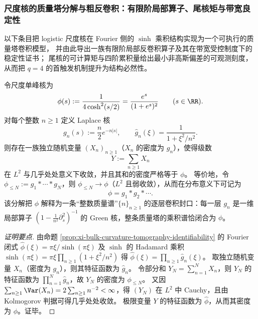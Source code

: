 
\subsubsection{尺度核的质量塔分解与粗反卷积：有限阶局部算子、尾核矩与带宽良定性}\label{subsubsec:xi-scale-kernel-mass-tower-deconvolution}
以下条目把 logistic 尺度核在 Fourier 侧的 \(\sinh\) 乘积结构实现为一个可执行的质量塔卷积模型，
并由此导出一族有限阶局部反卷积算子及其在带宽受控制度下的稳定性证书；
尾核的可计算矩与四阶累积量给出最小非高斯偏差的可观测刻度，从而把 \(q=4\) 的首触发机制提升为结构必然性。

\begin{conclusion}\label{con:xi-terminal-scale-kernel-mass-tower-laplace}
令尺度单峰核为
\[
\phi(s):=\frac{1}{4\cosh^{2}(s/2)}=\frac{e^{s}}{(1+e^{s})^{2}}\qquad(s\in\RR).
\]
对每个整数 \(n\ge 1\) 定义 Laplace 核
\[
g_n(s):=\frac{n}{2}e^{-n|s|},
\qquad
\widehat g_n(\xi)=\frac{1}{1+\xi^{2}/n^{2}}.
\]
则存在一族独立随机变量 \((X_n)_{n\ge 1}\)（\(X_n\) 的密度为 \(g_n\)），使得级数
\[
Y:=\sum_{n\ge 1}X_n
\]
在 \(L^{2}\) 与几乎处处意义下收敛，并且其和的密度严格等于 \(\phi\)。
等价地，令 \(\phi_{\le N}:=g_1*\cdots*g_N\)，则 \(\phi_{\le N}\to\phi\)（\(L^2\) 且弱收敛），从而在分布意义下可记为
\[
\phi=g_1*g_2*\cdots .
\]
该分解把 \(\phi\) 解释为一条“整数质量谱”\(\{n\}_{n\ge 1}\) 的逐层卷积封口：每一层 \(g_n\) 是一维局部算子 \((1-\frac{1}{n^{2}}\partial_s^{2})^{-1}\) 的 Green 核，整条质量塔的乘积谱恰闭合为 \(\phi\)。
\end{conclusion}
\begin{proof}[证明要点]
由命题 \ref{prop:xi-bulk-curvature-tomography-identifiability} 的 Fourier 闭式 \(\widehat\phi(\xi)=\pi\xi/\sinh(\pi\xi)\) 及 \(\sinh\) 的 Hadamard 乘积
\(
\sinh(\pi\xi)=\pi\xi\prod_{n\ge 1}(1+\xi^{2}/n^{2})
\)
得
\(
\widehat\phi(\xi)=\prod_{n\ge 1}\widehat g_n(\xi)
\)。
取独立随机变量 \(X_n\)（密度为 \(g_n\)），则其特征函数为 \(\widehat g_n\)。
令部分和 \(Y_N=\sum_{n=1}^{N}X_n\)，则 \(Y_N\) 的特征函数为 \(\prod_{n=1}^{N}\widehat g_n\)，故 \(Y_N\) 的密度为 \(\phi_{\le N}\)。
又因 \(\sum_{n\ge 1}\Var(X_n)=2\sum_{n\ge 1}n^{-2}<\infty\)，得 \((Y_N)\) 在 \(L^2\) 中 Cauchy，且由 Kolmogorov 判据可得几乎处处收敛。
极限变量 \(Y\) 的特征函数为 \(\widehat\phi\)，从而其密度为 \(\phi\)。证毕。
\end{proof}

